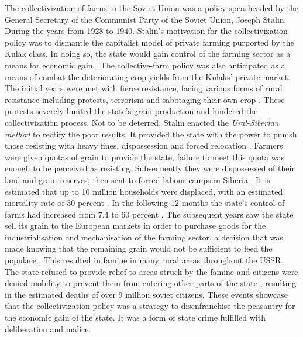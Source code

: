 \documentclass[11pt, a4paper,]{scrartcl}
\begin{document}
The collectivization of farms in the Soviet Union was a policy spearheaded by the General Secretary of the Communist Party of the Soviet Union, Joseph Stalin. During the years from 1928 to 1940. Stalin's motivation for the collectivization policy was to dismantle the capitalist model of private farming purported by the Kulak class. In doing so, the state would gain control of the farming sector as a means for economic gain \cite{Hughes1994}. The collective-farm policy was also anticipated as a means of combat the deteriorating crop yields from the Kulaks' private market. The initial years were met with fierce resistance, facing various forms of rural resistance including protests, terrorism and sabotaging their own crop \cite{Marker1998}. These protests severely limited the state's grain production and hindered the collectivization process. Not to be deterred, Stalin enacted the \textit{Ural-Siberian method} to rectify the poor results. It provided the state with the power to punish those resisting with heavy fines, dispossession and forced relocation \cite{Hughes1994}. Farmers were given quotas of grain to provide the state, failure to meet this quota was enough to be perceived as resisting. Subsequently they were dispossessed of their land and grain reserves, then sent to forced labour camps in Siberia \cite{Kalashnikov2018}. It is estimated that up to 10 million households were displaced, with an estimated mortality rate of 30 percent \cite{Khlevniuk2004TheTerror}. In the following 12 months the state's control of farms had increased from 7.4 to 60 percent \cite{Khlevniuk2004TheTerror}. The subsequent years saw the state sell its grain to the European markets in order to purchase goods for the industrialisation and mechanisation of the farming sector, a decision that was made knowing that the remaining grain would not be sufficient to feed the populace \cite{Hughes1991}. This resulted in famine in many rural areas throughout the USSR. The state refused to provide relief to areas struck by the famine and citizens were denied mobility to prevent them from entering other parts of the state \cite{Livi-Bacci1993OnUnion}, resulting in the estimated deaths of over 9 million soviet citizens. These events showcase that the collectivization policy was a strategy to disenfranchise the peasantry for the economic gain of the state. It was a form of state crime fulfilled with deliberation and malice.
\par
\end{document}
